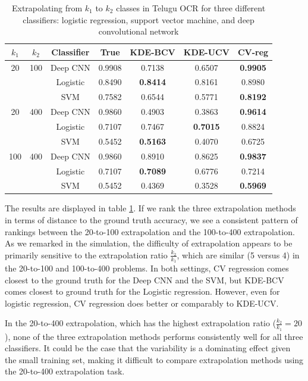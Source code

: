 \documentclass[twoside,11pt]{article}
\begin{document}
\begin{table}
\centering
\begin{tabular}{c|c||c|c||c|c|c}
$k_1$ & $k_2$ & Classifier & True & KDE-BCV & KDE-UCV & CV-reg \\ \hline
 20 & 100 & Deep CNN & 0.9908 & 0.7138 & 0.6507 & \textbf{0.9905} \\ 
    &     & Logistic & 0.8490 & \textbf{0.8414} & 0.8161 & 0.8980 \\
    &     & SVM      & 0.7582 & 0.6544 & 0.5771 & \textbf{0.8192} \\ \hline
 20 & 400 & Deep CNN & 0.9860 & 0.4903 & 0.3863 & \textbf{0.9614} \\
    &     & Logistic & 0.7107 & 0.7467 & \textbf{0.7015} & 0.8824 \\
    &     & SVM      & 0.5452 & \textbf{0.5163} & 0.4070 & 0.6725 \\ \hline
100 & 400 & Deep CNN & 0.9860 & 0.8910 & 0.8625 & \textbf{0.9837} \\ 
    &     & Logistic & 0.7107 & \textbf{0.7089} & 0.6776 & 0.7214 \\
    &     & SVM      & 0.5452 & 0.4369 & 0.3528 & \textbf{0.5969} \\ 
\hline
\end{tabular}
\caption{Extrapolating from $k_1$ to $k_2$ classes in Telugu OCR for three different classifiers: logistic regression, support vector machine, and deep convolutional network}\label{tab:tel_accuracy}
\end{table}

The results are displayed in table \ref{tab:tel_accuracy}.  If we rank the three extrapolation methods in terms of distance to the ground truth accuracy, we see a consistent pattern of rankings between the 20-to-100 extrapolation and the 100-to-400 extrapolation.  As we remarked in the simulation, the difficulty of extrapolation appears to be primarily sensitive to the extrapolation ratio $\frac{k_2}{k_1}$, which are similar (5 versus 4) in the 20-to-100 and 100-to-400 problems.  In both settings, CV regression comes closest to the ground truth for the Deep CNN and the SVM, but KDE-BCV comes closest to ground truth for the Logistic regression.  However, even for logistic regression, CV regression does better or comparably to KDE-UCV.

In the 20-to-400 extrapolation, which has the highest extrapolation ratio ($\frac{k_2}{k_1} = 20$), none of the three extrapolation methods performs consistently well for all three classifiers.  It could be the case that the variability is a dominating effect given the small training set, making it difficult to compare extrapolation methods using the 20-to-400 extrapolation task.
\end{document}
